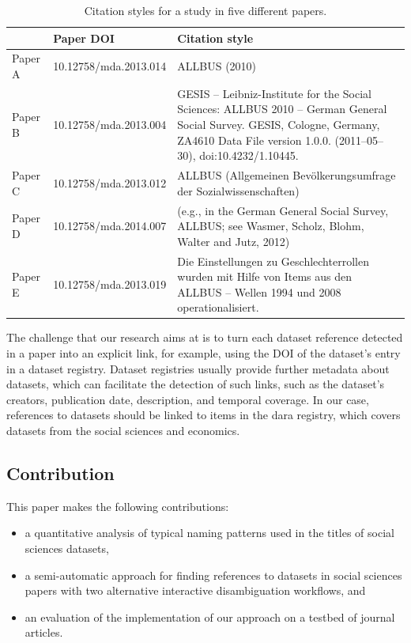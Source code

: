 \documentclass{IOS-Book-Article}
\newcommand{\dara}{\textsf{da\textbar ra}}
\begin{document}
\begin{table}[h!]
	\renewcommand{\arraystretch}{2}
	\centering
	\begin{tabular}{p{}p{3cm}p{5cm}}
		\hline
		& Paper DOI &Citation style \\
		\hline
		Paper A  & 10.12758/mda.2013.014 &ALLBUS (2010)\\
		
		Paper B  & 10.12758/mda.2013.004 &GESIS -- Leibniz-Institute for the Social Sciences: ALLBUS 2010 -- German General Social Survey. GESIS, Cologne, Germany, ZA4610 Data File version 1.0.0. (2011--05--30), doi:10.4232/1.10445. \\ 
		
		Paper C & 10.12758/mda.2013.012 &ALLBUS (Allgemeinen Bev\"olkerungsumfrage der Sozialwissenschaften)\\
		
		Paper D & 10.12758/mda.2014.007 &(e.g., in the German General Social Survey, ALLBUS; see Wasmer, Scholz, Blohm, Walter and Jutz, 2012)\\
		
		Paper E & 10.12758/mda.2013.019 & Die Einstellungen zu Geschlechterrollen wurden mit Hilfe von Items aus den ALLBUS -- Wellen 1994 und 2008 operationalisiert.\\\hline
	\end{tabular}
	\caption{Citation styles for a study in five different papers.}
	\label{table:citation-variety}
\end{table}

The challenge that our research aims at is to turn each dataset reference detected in a paper into an explicit link, for example, using the DOI of the dataset's entry in a dataset registry. 
Dataset registries usually provide further metadata about datasets, which can facilitate the detection of such links, such as the dataset's creators, publication date, description, and temporal coverage.
In our case, references to datasets should be linked to items in the {\dara} registry, which covers datasets from the social sciences and economics.

\subsection{Contribution}

This paper makes the following contributions:
\begin{itemize}
\item a quantitative analysis of typical naming patterns used in the titles of social sciences datasets,
\item a semi-automatic approach for finding references to datasets in social sciences papers with two alternative interactive disambiguation workflows, and
\item an evaluation of the implementation of our approach on a testbed of journal articles.  
\end{itemize}
\end{document}
